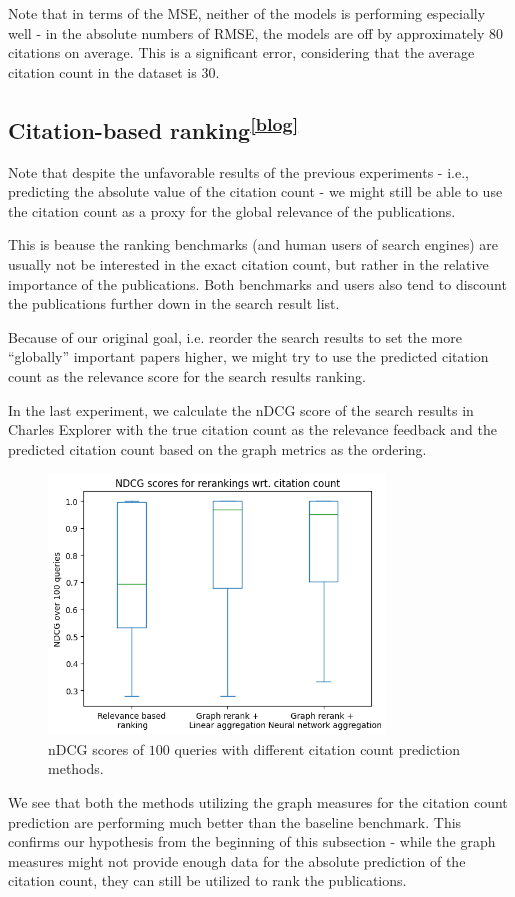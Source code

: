 Note that in terms of the \ac{MSE}, neither of the models is performing especially well - in the absolute numbers of \ac{RMSE}, the models are off by approximately $80$ citations on average.
This is a significant error, considering that the average citation count in the dataset is $30$.

\subsection[Citation-based ranking]{Citation-based ranking\textsuperscript{\href{https://jindrich.bar/edu/thesis-blog/citation-count/\#citation-based-ranking}{[blog]}}}\label{citation-based-ranking}

Note that despite the unfavorable results of the previous experiments - i.e., predicting the absolute value of the citation count - we might still be able to use the citation count as a proxy for the global relevance of the publications.

This is beause the ranking benchmarks (and human users of search engines) are usually not be interested in the exact citation count, but rather in the relative importance of the publications. 
Both benchmarks and users also tend to discount the publications further down in the search result list.

Because of our original goal, i.e. reorder the search results to set the more “globally” important papers higher,
we might try to use the predicted citation count as the relevance score for the search results ranking.

In the last experiment, we calculate the nDCG score of the search results in Charles Explorer with the true citation count as the relevance feedback and the predicted citation count based on the graph metrics as the ordering.

\begin{figure}[ht!]
    \captionsetup{width=.9\linewidth}
    \includegraphics[width=0.8\textwidth]{../img/ndcg_citations.png}
    \centering
    \caption{nDCG scores of $100$ queries with different citation count prediction methods.}
\end{figure}

We see that both the methods utilizing the graph measures for the citation count prediction are performing much better than the baseline benchmark.
This confirms our hypothesis from the beginning of this subsection - while the graph measures might not provide enough data for the absolute prediction of the citation count, they can still be utilized to rank the publications.